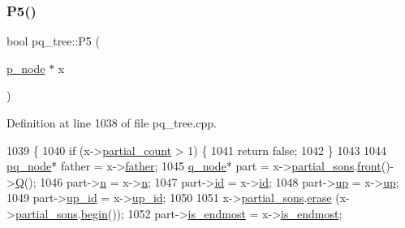 \subsubsection{\texorpdfstring{P5()}{P5()}}
{\footnotesize\ttfamily bool pq\+\_\+tree\+::\+P5 (\begin{DoxyParamCaption}\item[{\mbox{\hyperlink{classp__node}{p\+\_\+node}} $\ast$}]{x }\end{DoxyParamCaption})\hspace{0.3cm}{\ttfamily [private]}}



Definition at line 1038 of file pq\+\_\+tree.\+cpp.


\begin{DoxyCode}
1039 \{
1040     \textcolor{keywordflow}{if} (x->\mbox{\hyperlink{classp__node_a9ac93f9a0f474dcc74312e820fde73b6}{partial\_count}} > 1) \{
1041     \textcolor{keywordflow}{return} \textcolor{keyword}{false};
1042     \}
1043     
1044     \mbox{\hyperlink{classpq__node}{pq\_node}}* father = x->\mbox{\hyperlink{classpq__node_a3e7c886498c76c633f057fb42ff9c435}{father}};
1045     \mbox{\hyperlink{classq__node}{q\_node}}* part = x->\mbox{\hyperlink{classp__node_a8acc45be68133af1b6a2823875729798}{partial\_sons}}.\mbox{\hyperlink{classsymlist_afd4b55616fc20033d4a47684551866e8}{front}}()->\mbox{\hyperlink{classpq__node_aeeefcfcd19dbe4ca94e190006e8dd484}{Q}}();     
1046     part->\mbox{\hyperlink{classpq__node_a4997fd09a95d9a659b99cea04197740a}{n}} = x->\mbox{\hyperlink{classpq__node_a4997fd09a95d9a659b99cea04197740a}{n}};
1047     part->\mbox{\hyperlink{classpq__node_ad0034c1f93c3c77edb6d3a03f25aba06}{id}} = x->\mbox{\hyperlink{classpq__node_ad0034c1f93c3c77edb6d3a03f25aba06}{id}};
1048     part->\mbox{\hyperlink{classpq__node_ae6d5a236397b9a57159487eac7ec168d}{up}} = x->\mbox{\hyperlink{classpq__node_ae6d5a236397b9a57159487eac7ec168d}{up}};
1049     part->\mbox{\hyperlink{classpq__node_a5a7bcdde1f57191a77a6a14994b38a50}{up\_id}} = x->\mbox{\hyperlink{classpq__node_a5a7bcdde1f57191a77a6a14994b38a50}{up\_id}};
1050 
1051     x->\mbox{\hyperlink{classp__node_a8acc45be68133af1b6a2823875729798}{partial\_sons}}.\mbox{\hyperlink{classsymlist_a75fc1fc7db7b20cc430ddb8577608904}{erase}} (x->\mbox{\hyperlink{classp__node_a8acc45be68133af1b6a2823875729798}{partial\_sons}}.\mbox{\hyperlink{classsymlist_a525b8d44af5d771fe15916372515cce0}{begin}}());
1052     part->\mbox{\hyperlink{classpq__node_a058dda3d1197dfd2b343d1983d305d79}{is\_endmost}} = x->\mbox{\hyperlink{classpq__node_a058dda3d1197dfd2b343d1983d305d79}{is\_endmost}};

\end{DoxyCode}
